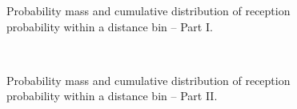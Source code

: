 \documentclass[11pt,twocolumn]{article}
\begin{document}
\begin{figure}
{}
\caption{Probability mass and cumulative distribution of reception probability within a distance bin -- Part I.}
\label{fig:distribution1}
\end{figure}

\begin{figure}[ht]
\centering
\mbox{
}
\mbox{
}
\caption{Probability mass and cumulative distribution of reception probability within a distance bin -- Part II.}
\label{fig:distribution2}
\end{figure}
\end{document}
